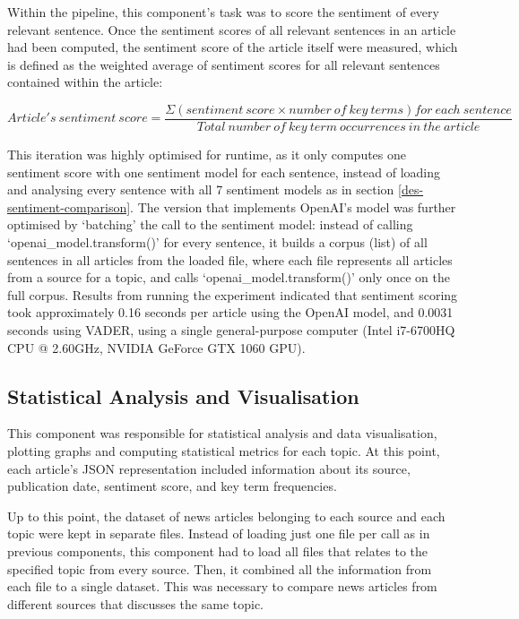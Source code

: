 \documentclass{report}
\begin{document}
Within the pipeline, this component's task was to score the sentiment of every relevant sentence.
Once the sentiment scores of all relevant sentences in an article had been computed, the sentiment score of the article itself were measured, which is defined as the weighted average of sentiment scores for all relevant sentences contained within the article:

\begin{center}
	$Article's \ sentiment \ score = \dfrac{\Sigma (sentiment \ score \times number \ of \ key \ terms) for \ each \ sentence}{Total \ number \ of \ key \ term \ occurrences \ in \ the \ article}$
\end{center}

This iteration was highly optimised for runtime, as it only computes one sentiment score with one sentiment model for each sentence, instead of loading and analysing every sentence with all 7 sentiment models as in section \ref{des-sentiment-comparison}.
The version that implements OpenAI's model was further optimised by `batching' the call to the sentiment model: instead of calling `openai\_model.transform()' for every sentence, it builds a corpus (list) of all sentences in all articles from the loaded file, where each file represents all articles from a source for a topic, and calls `openai\_model.transform()' only once on the full corpus.
Results from running the experiment indicated that sentiment scoring took approximately 0.16 seconds per article using the OpenAI model, and 0.0031 seconds using VADER, using a single general-purpose computer (Intel i7-6700HQ CPU @ 2.60GHz, NVIDIA GeForce GTX 1060 GPU).

\subsection{Statistical Analysis and Visualisation} \label{des-visualisation}

This component was responsible for statistical analysis and data visualisation, plotting graphs and computing statistical metrics for each topic.
At this point, each article's JSON representation included information about its source, publication date, sentiment score, and key term frequencies.

Up to this point, the dataset of news articles belonging to each source and each topic were kept in separate files.
Instead of loading just one file per call as in previous components, this component had to load all files that relates to the specified topic from every source.
Then, it combined all the information from each file to a single dataset.
This was necessary to compare news articles from different sources that discusses the same topic.
\end{document}
